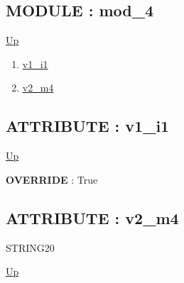 \subsection*{MODULE : mod\_4}
\hypertarget{ecldoc:example_2.mod_4}{}
\par
\begin{minipage}[t]{\textwidth}
\begin{flushleft}
  
\end{flushleft}
\end{minipage}
\hyperlink{ecldoc:example_2}{Up} \\
\par
\par
\begin{enumerate}
\item \hyperlink{ecldoc:example_2.mod_4.v1_i1}{v1\_i1}
\item \hyperlink{ecldoc:example_2.mod_4.v2_m4}{v2\_m4}
\end{enumerate}
\subsection*{ATTRIBUTE : v1\_i1}
\hypertarget{ecldoc:example_2.mod_4.v1_i1}{}
\par
\begin{minipage}[t]{\textwidth}
\begin{flushleft}
  
\end{flushleft}
\end{minipage}
\hyperlink{ecldoc:example_2.mod_4}{Up} \\
\par
\par
\textbf{OVERRIDE} : True \\
\subsection*{ATTRIBUTE : v2\_m4}
\hypertarget{ecldoc:example_2.mod_4.v2_m4}{}
\par
\begin{minipage}[t]{\textwidth}
\begin{flushleft}
STRING20  
\end{flushleft}
\end{minipage}
\hyperlink{ecldoc:example_2.mod_4}{Up} \\
\par
\par


